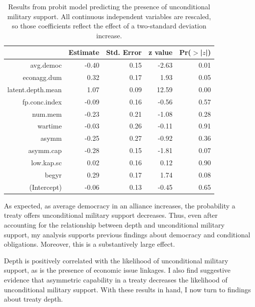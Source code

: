 \documentclass[12pt]{article}
\begin{document}
\begin{table}[ht]
\centering
\begin{tabular}{rrrrr}
  \hline
 & Estimate & Std. Error & z value & Pr($>$|$z$|) \\ 
  \hline
  avg.democ & -0.40 & 0.15 & -2.63 & 0.01 \\ 
  econagg.dum & 0.32 & 0.17 & 1.93 & 0.05 \\ 
  latent.depth.mean & 1.07 & 0.09 & 12.59 & 0.00 \\ 
  fp.conc.index & -0.09 & 0.16 & -0.56 & 0.57 \\ 
  num.mem & -0.23 & 0.21 & -1.08 & 0.28 \\ 
  wartime & -0.03 & 0.26 & -0.11 & 0.91 \\ 
  asymm & -0.25 & 0.27 & -0.92 & 0.36 \\ 
  asymm.cap & -0.28 & 0.15 & -1.81 & 0.07 \\ 
  low.kap.sc & 0.02 & 0.16 & 0.12 & 0.90 \\ 
  begyr & 0.29 & 0.17 & 1.74 & 0.08 \\ 
  (Intercept) & -0.06 & 0.13 & -0.45 & 0.65 \\ 
   \hline
\end{tabular}
\caption{Results from probit model predicting the presence of unconditional military support. All continuous independent variables are rescaled, so those coefficients reflect the effect of a two-standard deviation increase.}
\label{tab:uncond-res}
\end{table}


As expected, as average democracy in an alliance increases, the probability a treaty offers unconditional military support decreases. 
Thus, even after accounting for the relationship between depth and unconditional military support, my analysis supports previous findings about democracy and conditional obligations. 
Moreover, this is a substantively large effect. 

Depth is positively correlated with the likelihood of unconditional military support, as is the presence of economic issue linkages. 
I also find suggestive evidence that asymmetric capability in a treaty decreases the likelihood of unconditional military support. 
With these results in hand, I now turn to findings about treaty depth. 
\end{document}

